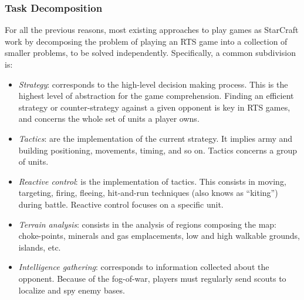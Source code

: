 \documentclass[journal]{IEEEtran}
\begin{document}
\subsubsection{Task Decomposition}
For all the previous reasons, most existing approaches to play games as StarCraft work by decomposing the problem of playing an RTS game into a collection of smaller problems, to be solved independently. Specifically, a common subdivision is:
\begin{itemize}
\item {\em Strategy}: corresponds to the high-level decision making process. This is
 the highest level of abstraction for the game comprehension. Finding an efficient strategy or
 counter-strategy against a given opponent is key in RTS games, and concerns the whole
 set of units a player owns. %
\item {\em Tactics}: are the implementation of the current strategy. It
 implies army and building positioning, movements, timing, and so
 on. Tactics concerns a group of units. %
\item {\em Reactive control}: is the implementation of tactics. This
 consists in moving, targeting, firing, fleeing, hit-and-run
 techniques (also knows as ``kiting'') during battle. Reactive control focuses
 on a specific unit. %
%
\item {\em Terrain analysis}: consists in the analysis of regions composing
 the map: choke-points, minerals and gas emplacements, low and high
 walkable grounds, islands, etc.
\item {\em Intelligence gathering}: corresponds to information collected about
 the opponent. Because of the fog-of-war, players must
 regularly send scouts to localize and spy enemy bases.%
\end{itemize}
\end{document}
